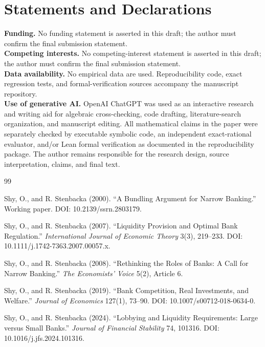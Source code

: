 \section*{Statements and Declarations}
\textbf{Funding.} No funding statement is asserted in this draft; the author must confirm the final submission statement.\\
\textbf{Competing interests.} No competing-interest statement is asserted in this draft; the author must confirm the final submission statement.\\
\textbf{Data availability.} No empirical data are used. Reproducibility code, exact regression tests, and formal-verification sources accompany the manuscript repository.\\
\textbf{Use of generative AI.} OpenAI ChatGPT was used as an interactive research and writing aid for algebraic cross-checking, code drafting, literature-search organization, and manuscript editing. All mathematical claims in the paper were separately checked by executable symbolic code, an independent exact-rational evaluator, and/or Lean formal verification as documented in the reproducibility package. The author remains responsible for the research design, source interpretation, claims, and final text.

\begin{thebibliography}{99}

Shy, O., and R. Stenbacka (2000).
“A Bundling Argument for Narrow Banking.” Working paper. DOI: 10.2139/ssrn.2803179.

Shy, O., and R. Stenbacka (2007).
“Liquidity Provision and Optimal Bank Regulation.” \emph{International Journal of Economic Theory} 3(3), 219--233. DOI: 10.1111/j.1742-7363.2007.00057.x.

Shy, O., and R. Stenbacka (2008).
“Rethinking the Roles of Banks: A Call for Narrow Banking.” \emph{The Economists' Voice} 5(2), Article 6.

Shy, O., and R. Stenbacka (2019).
“Bank Competition, Real Investments, and Welfare.” \emph{Journal of Economics} 127(1), 73--90. DOI: 10.1007/s00712-018-0634-0.

Shy, O., and R. Stenbacka (2024).
“Lobbying and Liquidity Requirements: Large versus Small Banks.” \emph{Journal of Financial Stability} 74, 101316. DOI: 10.1016/j.jfs.2024.101316.

\end{thebibliography}
